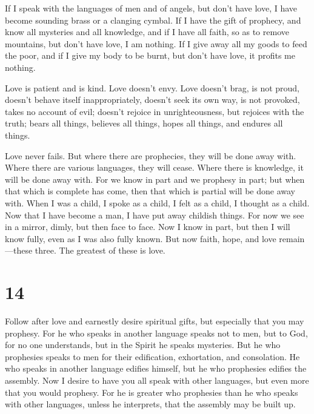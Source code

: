  If I speak with the languages of men and of angels, but
don't have love, I have become sounding brass or a clanging cymbal.
 If I have the gift of prophecy, and know all mysteries and
all knowledge, and if I have all faith, so as to remove mountains, but
don't have love, I am nothing.  If I give away all my goods
to feed the poor, and if I give my body to be burnt, but don't have
love, it profits me nothing.

 Love is patient and is kind. Love doesn't envy. Love
doesn't brag, is not proud,  doesn't behave itself
inappropriately, doesn't seek its own way, is not provoked, takes no
account of evil;  doesn't rejoice in unrighteousness, but
rejoices with the truth;  bears all things, believes all
things, hopes all things, and endures all things.

 Love never fails. But where there are prophecies, they will
be done away with. Where there are various languages, they will cease.
Where there is knowledge, it will be done away with.  For we
know in part and we prophesy in part;  but when that which
is complete has come, then that which is partial will be done away with.
 When I was a child, I spoke as a child, I felt as a child,
I thought as a child. Now that I have become a man, I have put away
childish things.  For now we see in a mirror, dimly, but
then face to face. Now I know in part, but then I will know fully, even
as I was also fully known.  But now faith, hope, and love
remain---these three. The greatest of these is love.

\hypertarget{section-13}{%
\section{14}\label{section-13}}

 Follow after love and earnestly desire spiritual gifts, but
especially that you may prophesy.  For he who speaks in
another language speaks not to men, but to God, for no one understands,
but in the Spirit he speaks mysteries.  But he who
prophesies speaks to men for their edification, exhortation, and
consolation.  He who speaks in another language edifies
himself, but he who prophesies edifies the assembly.  Now I
desire to have you all speak with other languages, but even more that
you would prophesy. For he is greater who prophesies than he who speaks
with other languages, unless he interprets, that the assembly may be
built up.

